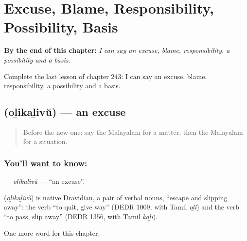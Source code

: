
\chapter{Excuse, Blame, Responsibility, Possibility, Basis}
\label{ch:ml-excuse-blame-responsibility-possibility-basis}

\begin{chapteropening}
\textbf{By the end of this chapter:} \emph{I can say an excuse, blame, responsibility, a possibility and a basis.}

Complete the last lesson of chapter 243: I can say an excuse, blame, responsibility, a possibility and a basis.
\end{chapteropening}

\section[\texorpdfstring{\ml{ഒഴികഴിവ്} (oḻikaḻivŭ)}{ഒഴികഴിവ് (oḻikaḻivŭ)}]{ (oḻikaḻivŭ) — an excuse}

\label{lesson:ML-C243-olikalivu}



\begin{quote}
Before the new one: say the Malayalam for a matter, then the Malayalam for a situation.
\end{quote}

\subsection*{You'll want to know: }
\textbf{} — \emph{oḻikaḻivŭ} — \textquotedblleft{}an excuse\textquotedblright{}.

\begin{cousinweb}
\textbf{} (\emph{oḻikaḻivŭ}) is native Dravidian, a pair of verbal nouns, \textquotedblleft{}escape and slipping away\textquotedblright{}: the verb \textquotedblleft{}to quit, give way\textquotedblright{} (DEDR 1009, with Tamil \emph{oḻi}) and the verb \textquotedblleft{}to pass, slip away\textquotedblright{} (DEDR 1356, with Tamil \emph{kaḻi}).
\end{cousinweb}

\begin{grammarlens}[title={What you've built}]
One more word for this chapter.
\end{grammarlens}

